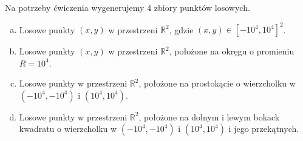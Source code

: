 \quad Na potrzeby ćwiczenia wygenerujemy $4$ zbiory punktów losowych.
\begin{enumerate}[a)]
    \item Losowe punkty $(x, y)$ w przestrzeni $\mathbb{R}^2$, gdzie $(x, y) \in \left[-10^4,10^4\right]^{2}$.
    \item Losowe punkty $(x, y)$ w przestrzeni $\mathbb{R}^2$, położone na okręgu o promieniu $R = 10^4$.
    \item Losowe punkty w przestrzeni $\mathbb{R}^2$, 
    położone na prostokącie o wierzcholku w $(-10^4, -10^4)$ i $(10^4, 10^4)$.
    \item Losowe punkty w przestrzeni $\mathbb{R}^2$, 
    położone na dolnym i lewym bokack kwadratu o wierzcholku w $(-10^4, -10^4)$ i $(10^4, 10^4)$ i jego przekątnych.
\end{enumerate}
